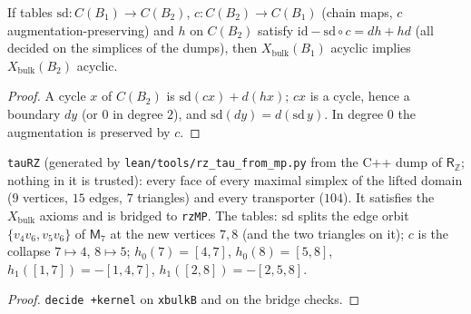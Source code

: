 \begin{theorem}\label{thm:mp-retr}
  \leanok
  If tables $\mathrm{sd}\colon C(B_1)\to C(B_2)$, $c\colon C(B_2)\to C(B_1)$ (chain maps, $c$ augmentation-preserving) and $h$ on $C(B_2)$
  satisfy $\mathrm{id}-\mathrm{sd}\circ c=dh+hd$ (all decided on the simplices of the dumps), then $X_{\mathrm{bulk}}(B_1)$ acyclic
  implies $X_{\mathrm{bulk}}(B_2)$ acyclic.
\end{theorem}
\begin{proof}
  \leanok
  A cycle $x$ of $C(B_2)$ is $\mathrm{sd}(cx)+d(hx)$; $cx$ is a cycle, hence a boundary $dy$ (or $0$ in degree $2$), and
  $\mathrm{sd}(dy)=d(\mathrm{sd}\,y)$.  In degree $0$ the augmentation is preserved by $c$.
\end{proof}

\begin{definition}\label{def:mp-rz-tau}
  \leanok
  \texttt{tauRZ} (generated by \texttt{lean/tools/rz\_tau\_from\_mp.py} from the C++ dump of $\mathsf R_{\mathbb Z}$; nothing in it is
  trusted): every face of every maximal simplex of the lifted domain ($9$ vertices, $15$ edges, $7$ triangles) and every transporter
  ($104$).  It satisfies the $X_{\mathrm{bulk}}$ axioms and is bridged to \texttt{rzMP}.  The tables: $\mathrm{sd}$ splits the edge orbit
  $\{v_4v_6,v_5v_6\}$ of $\mathsf M_7$ at the new vertices $7,8$ (and the two triangles on it); $c$ is the collapse $7\mapsto4$,
  $8\mapsto5$; $h_0(7)=[4,7]$, $h_0(8)=[5,8]$, $h_1([1,7])=-[1,4,7]$, $h_1([2,8])=-[2,5,8]$.
\end{definition}
\begin{proof}
  \leanok
  \texttt{decide +kernel} on \texttt{xbulkB} and on the bridge checks.
\end{proof}

